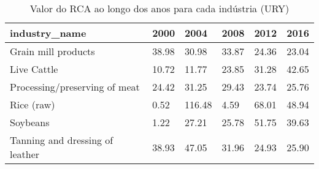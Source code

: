 \begin{table}
\centering
\caption{Valor do RCA ao longo dos anos para cada indústria (URY)}
\begin{tabular}{p{6cm}p{1.5cm}p{1.5cm}p{1.5cm}p{1.5cm}p{1.5cm}}
\toprule
                  industry\_name &  2000 &   2004 &  2008 &  2012 &  2016 \\
\midrule
            Grain mill products & 38.98 &  30.98 & 33.87 & 24.36 & 23.04 \\
                    Live Cattle & 10.72 &  11.77 & 23.85 & 31.28 & 42.65 \\
  Processing/preserving of meat & 24.42 &  31.25 & 29.43 & 23.74 & 25.76 \\
                     Rice (raw) &  0.52 & 116.48 &  4.59 & 68.01 & 48.94 \\
                       Soybeans &  1.22 &  27.21 & 25.78 & 51.75 & 39.63 \\
Tanning and dressing of leather & 38.93 &  47.05 & 31.96 & 24.93 & 25.90 \\
\bottomrule
\end{tabular}
\end{table}
